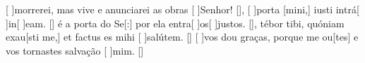{    {[ ]{mor}rerei, mas vive e anunciarei as obras [ ]{Se}{\-nhor}! [\LinkPT]},
  {[ ]{por}ta [mini,] iusti intrá[ ]{in}[ ]{e}am. [\LinkLA]}%
    { é a porta do Se[:] por ela entra[ ]{os}[ ]{jus}tos. [\LinkPT]},
  {tébor tibi, quóniam exau[sti me,] et factus es mihi [ ]{sa}{lú}tem. [\LinkLA]}%
    {[ ]{vos} dou graças, porque me ou[tes] e vos tornastes salvação [ ]{mim}. [\LinkPT]}
}